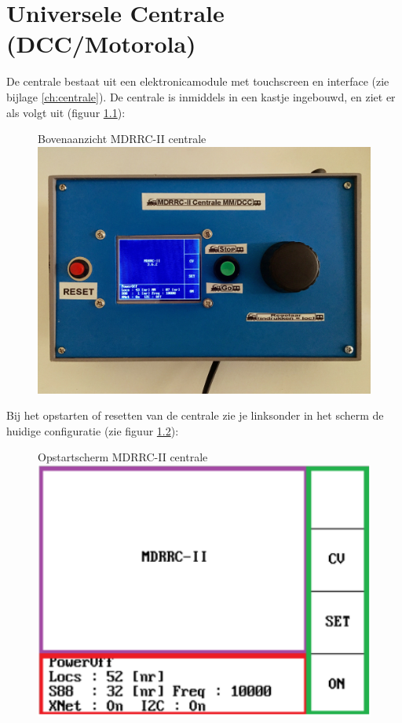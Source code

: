 \documentclass[12pt,a4paper]{report}
\begin{document}
\chapter{Universele Centrale (DCC/Motorola)}
De centrale bestaat uit een elektronicamodule met touchscreen en interface (zie bijlage \ref{ch:centrale}). De centrale is inmiddels in een kastje ingebouwd, en ziet er als volgt uit (figuur \ref{centrale}):
\\

\begin{figure}[ht]
  \captionbox
  {Bovenaanzicht MDRRC-II centrale\label{centrale}}
  {\includegraphics[scale=0.1]{images/rcu_foto1}}\\
\end{figure}

Bij het opstarten of resetten van de centrale zie je linksonder in het scherm de huidige configuratie (zie figuur \ref{rcu-foto4}):

\begin{figure}[h]
  \captionbox
  {Opstartscherm MDRRC-II centrale\label{rcu-foto4}}
  {\includegraphics[scale=0.6]{images/rcu_foto4}}\\
\end{figure}
\end{document}

